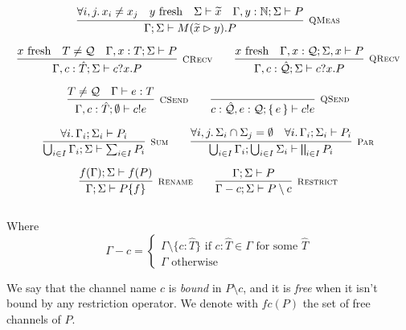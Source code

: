 \begin{gather*}
\infer[\mbox{\footnotesize\scshape QMeas}]{\Gamma; \Sigma \vdash M(\widetilde{x} \rhd y) . P}
{\forall i, j \ldotp x_i \neq x_j & \text{$y$ fresh} & \Sigma \vdash \widetilde{x} & \Gamma, y : \mathbb{N}; \Sigma \vdash P} \\[0.2cm]
\infer[\mbox{\footnotesize\scshape CRecv}]
{\Gamma, c : \hat{T}; \Sigma \vdash c?x . P}
{\text{$x$ fresh} & T \neq \mathcal{Q} & \Gamma, x : T; \Sigma \vdash P} 
\qquad
\infer[\mbox{\footnotesize\scshape QRecv}]
{\Gamma, c : \hat{\mathcal{Q}}; \Sigma \vdash c?x . P}
{\text{$x$ fresh} & \Gamma, x : \mathcal{Q}; \Sigma, x \vdash P} 
\\[0.2cm]
\infer[\mbox{\footnotesize\scshape CSend}]{\Gamma, c : \hat{T}; \emptyset \vdash c!e}{T \neq \mathcal{Q} & \Gamma \vdash e : T} \qquad
\infer[\mbox{\footnotesize\scshape QSend}]{c : \hat{\mathcal{Q}}, e:\mathcal{Q} ; \set{e} \vdash c!e}{} \\[0.2cm]
\infer[\mbox{\footnotesize\scshape Sum}]{\bigcup_{i \in I}\Gamma_i; \Sigma \vdash \sum_{i \in I} P_i}{\forall i \ldotp \Gamma_i; \Sigma_i \vdash P_i} \qquad 
\infer[\mbox{\footnotesize\scshape Par}]{\bigcup_{i \in I}\Gamma_i; \bigcup_{i \in I}\Sigma_i \vdash \bigparallel_{i \in I} P_i}
{\forall i, j \ldotp \Sigma_i \cap \Sigma_j = \emptyset & \forall i \ldotp \Gamma_i; \Sigma_i \vdash P_i} \\[0.2cm]
\infer[\mbox{\footnotesize\scshape Rename}]{\Gamma; \Sigma \vdash P \{f\}}{f(\Gamma); \Sigma \vdash f(P)} \qquad
\infer[\mbox{\footnotesize\scshape Restrict}]{\Gamma - c; \Sigma \vdash P \setminus c}{\Gamma; \Sigma \vdash P} \\[0.3cm]
\end{gather*}

Where $$\Gamma - c = \begin{cases}
\Gamma \setminus \{c : \hat{T}\} \text{ if } c: \hat{T} \in \Gamma \text{ for some } \hat{T} \\
\Gamma \text{ otherwise}
\end{cases}$$

We say that the channel name $c$ is \textit{bound} in $P\setminus c$, and it is \textit{free} when it isn't bound by any restriction operator. We denote with $fc(P)$ the set of free channels of $P$.

